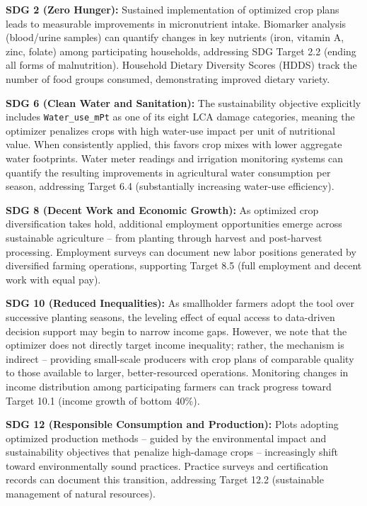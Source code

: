 \documentclass{oqireport}
\begin{document}
\textbf{SDG 2 (Zero Hunger):} Sustained implementation of optimized crop plans leads to measurable improvements in micronutrient intake. Biomarker analysis (blood/urine samples) can quantify changes in key nutrients (iron, vitamin A, zinc, folate) among participating households, addressing SDG Target 2.2 (ending all forms of malnutrition). Household Dietary Diversity Scores (HDDS) track the number of food groups consumed, demonstrating improved dietary variety.

\textbf{SDG 6 (Clean Water and Sanitation):} The sustainability objective explicitly includes \texttt{Water\_use\_mPt} as one of its eight LCA damage categories, meaning the optimizer penalizes crops with high water-use impact per unit of nutritional value. When consistently applied, this favors crop mixes with lower aggregate water footprints. Water meter readings and irrigation monitoring systems can quantify the resulting improvements in agricultural water consumption per season, addressing Target 6.4 (substantially increasing water-use efficiency).

\textbf{SDG 8 (Decent Work and Economic Growth):} As optimized crop diversification takes hold, additional employment opportunities emerge across sustainable agriculture -- from planting through harvest and post-harvest processing. Employment surveys can document new labor positions generated by diversified farming operations, supporting Target 8.5 (full employment and decent work with equal pay).

\textbf{SDG 10 (Reduced Inequalities):} As smallholder farmers adopt the tool over successive planting seasons, the leveling effect of equal access to data-driven decision support may begin to narrow income gaps. However, we note that the optimizer does not directly target income inequality; rather, the mechanism is indirect -- providing small-scale producers with crop plans of comparable quality to those available to larger, better-resourced operations. Monitoring changes in income distribution among participating farmers can track progress toward Target 10.1 (income growth of bottom 40\%).

\textbf{SDG 12 (Responsible Consumption and Production):} Plots adopting optimized production methods -- guided by the environmental impact and sustainability objectives that penalize high-damage crops -- increasingly shift toward environmentally sound practices. Practice surveys and certification records can document this transition, addressing Target 12.2 (sustainable management of natural resources).
\end{document}
